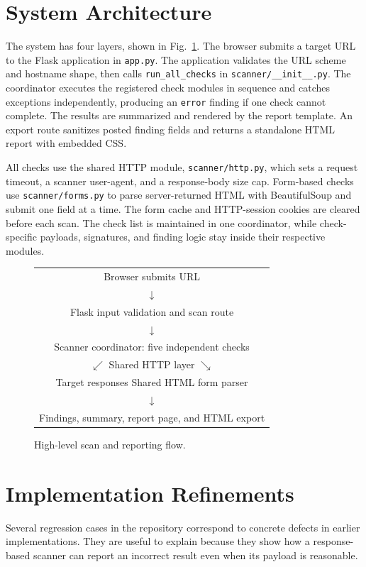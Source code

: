 \documentclass[conference]{IEEEtran}
\begin{document}
\section{System Architecture}
The system has four layers, shown in Fig.~\ref{fig:architecture}. The browser submits a target URL to the Flask
application in \texttt{app.py}. The application validates the URL scheme and
hostname shape, then calls \texttt{run\_all\_checks} in
\texttt{scanner/\_\_init\_\_.py}. The coordinator executes the registered
check modules in sequence and catches exceptions independently, producing an
\texttt{error} finding if one check cannot complete. The results are summarized
and rendered by the report template. An export route sanitizes posted finding
fields and returns a standalone HTML report with embedded CSS.

All checks use the shared HTTP module, \texttt{scanner/http.py}, which sets a
request timeout, a scanner user-agent, and a response-body size cap. Form-based
checks use \texttt{scanner/forms.py} to parse server-returned HTML with
BeautifulSoup and submit one field at a time. The form cache and HTTP-session
cookies are cleared before each scan. The check list is maintained in one
coordinator, while check-specific payloads, signatures, and finding logic stay
inside their respective modules.

\begin{figure}[!t]
\centering
\footnotesize
\begin{tabular}{c}
Browser submits URL\\
$\downarrow$\\
Flask input validation and scan route\\
$\downarrow$\\
Scanner coordinator: five independent checks\\
$\swarrow$ \hspace{0.2em} Shared HTTP layer \hspace{0.2em} $\searrow$\\
Target responses \hspace{1em} Shared HTML form parser\\
$\downarrow$\\
Findings, summary, report page, and HTML export
\end{tabular}
\caption{High-level scan and reporting flow.}
\label{fig:architecture}
\end{figure}

\section{Implementation Refinements}
Several regression cases in the repository correspond to concrete defects in
earlier implementations. They are useful to explain because they show how a
response-based scanner can report an incorrect result even when its payload
is reasonable.
\end{document}
